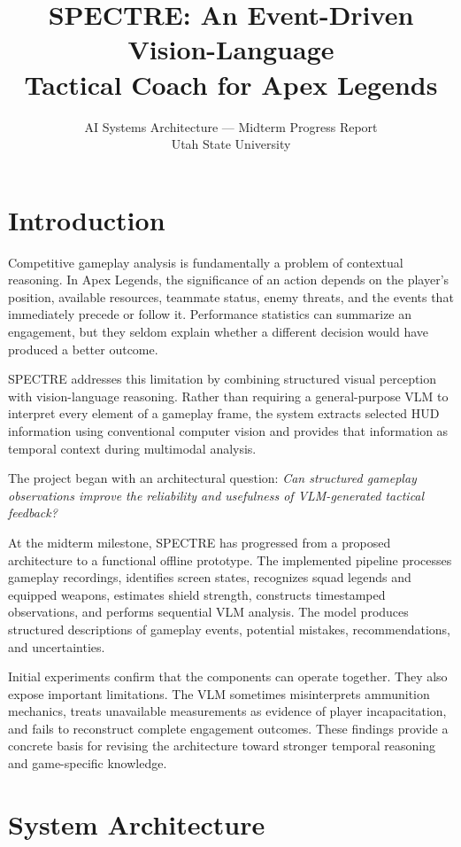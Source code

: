 \documentclass[10pt,letterpaper]{article}
\title{\vspace{-1.5em}\textbf{SPECTRE: An Event-Driven Vision-Language\\
Tactical Coach for Apex Legends}}
\author{AI Systems Architecture --- Midterm Progress Report\\
Utah State University}
\date{}
\begin{document}
\maketitle
\vspace{-2em}

\section{Introduction}

Competitive gameplay analysis is fundamentally a problem of contextual
reasoning. In Apex Legends, the significance of an action depends on
the player's position, available resources, teammate status, enemy
threats, and the events that immediately precede or follow it.
Performance statistics can summarize an engagement, but they seldom
explain whether a different decision would have produced a better
outcome.

SPECTRE addresses this limitation by combining structured visual
perception with vision-language reasoning. Rather than requiring a
general-purpose VLM to interpret every element of a gameplay frame,
the system extracts selected HUD information using conventional
computer vision and provides that information as temporal context
during multimodal analysis.

The project began with an architectural question: \textit{Can
structured gameplay observations improve the reliability and
usefulness of VLM-generated tactical feedback?}

At the midterm milestone, SPECTRE has progressed from a proposed
architecture to a functional offline prototype. The implemented
pipeline processes gameplay recordings, identifies screen states,
recognizes squad legends and equipped weapons, estimates shield
strength, constructs timestamped observations, and performs
sequential VLM analysis. The model produces structured descriptions
of gameplay events, potential mistakes, recommendations, and
uncertainties.

Initial experiments confirm that the components can operate together.
They also expose important limitations. The VLM sometimes
misinterprets ammunition mechanics, treats unavailable measurements
as evidence of player incapacitation, and fails to reconstruct
complete engagement outcomes. These findings provide a concrete
basis for revising the architecture toward stronger temporal
reasoning and game-specific knowledge.

\section{System Architecture}
\end{document}
